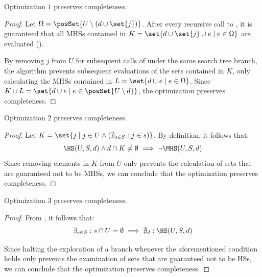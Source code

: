 \begin{theorem}
  Optimization $1$ preserves completeness.
\end{theorem}
\begin{proof}
  Let $ \Omega = \powSet{U \setminus (d \cup \set{j})}$.
  After every recursive call to \staccato{}, it is guaranteed that all
  \acp{MHS} contained in $K = \set{d \cup \set{j} \cup e \mid e \in
    \Omega}$ are evaluated ().

  By removing $j$ from $U$ for subsequent calls of \staccato{} under
  the same search tree branch, the algorithm prevents subsequent
  evaluations of the sets contained in $K$, only calculating the
  \acp{MHS} contained in $L = \set{d \cup e \mid e \in \Omega}$.
  Since $K \cup L = \set{d \cup{} e \mid e \in \powSet{U \setminus d}}$,
  the optimization preserves completeness.
\end{proof}

\begin{theorem}
  Optimization $2$ preserves completeness.
\end{theorem}
\begin{proof}
  Let $K = \set{j \mid j \in U \wedge (\nexists_{s \in S}: j\in s)}$.
  By definition, it follows that:
  \begin{equation}
    \HS(U,S, d) \wedge d \cap K \not=\emptyset \implies \neg \MHS(U,S, d)
  \end{equation}
  Since removing elements in $K$ from $U$ only prevents the
  calculation of sets that are guaranteed not to be \acp{MHS}, we can
  conclude that the optimization preserves completeness.
\end{proof}

\begin{theorem}
  Optimization $3$ preserves completeness.
\end{theorem}
\begin{proof}
  From , it follows that:
  \begin{equation}
    \exists_{s \in S} : s \cap U = \emptyset \implies \nexists_{d} : \HS(U,S,d)
  \end{equation}

  Since halting the exploration of a branch whenever the
  aforementioned condition holds only prevents the examination of sets
  that are guaranteed not to be \acp{HS}, we can conclude that the
  optimization preserves completeness.
\end{proof}

